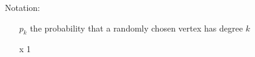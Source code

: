 Notation:


\begin{itemize}
	\item[$p_k$] the probability that a randomly chosen vertex has degree $k$
	\item[x] 1 
\end{itemize}
